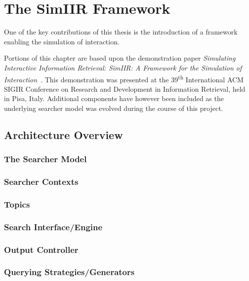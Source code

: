 
\chapter{The SimIIR Framework}\label{appx:simiir}
One of the key contributions of this thesis is the introduction of a framework enabling the simulation of interaction. 

\noindent
{} Portions of this chapter are based upon the demonstration paper \emph{Simulating Interactive Information Retrieval: SimIIR: A Framework for the Simulation of Interaction}~\citep{maxwell2016simiir}. This demonstration was presented at the 39\textsuperscript{th} International ACM SIGIR Conference on Research and Development in Information Retrieval, held in Pisa, Italy. Additional components have however been included as the underlying searcher model was evolved during the course of this project.

\section{Architecture Overview}

\subsection{The Searcher Model}

\subsection{Searcher Contexts}

\subsection{Topics}

\subsection{Search Interface/Engine}

\subsection{Output Controller}

\subsection{Querying Strategies/Generators}

